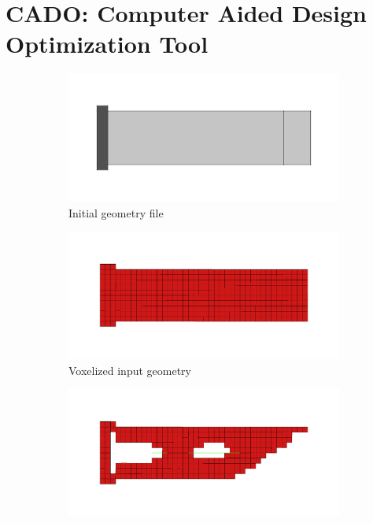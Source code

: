 \section{CADO: Computer Aided Design Optimization Tool}
\begin{figure}
\begin{subfigure}[t]{.49\textwidth}
\centering
\includegraphics[width=\textwidth]{Pictures/CADO_Overview/Back2CAD1.png}
\caption{Initial geometry file}
\end{subfigure}
\begin{subfigure}[t]{.49\textwidth}
\centering
\includegraphics[width=\textwidth]{Pictures/CADO_Overview/Back2CAD2.png}
\caption{Voxelized input geometry}
\end{subfigure}
\begin{subfigure}[t]{.49\textwidth}
\centering
\includegraphics[width=\textwidth]{Pictures/CADO_Overview/Back2CAD3.png}

\end{subfigure}
\end{figure}
